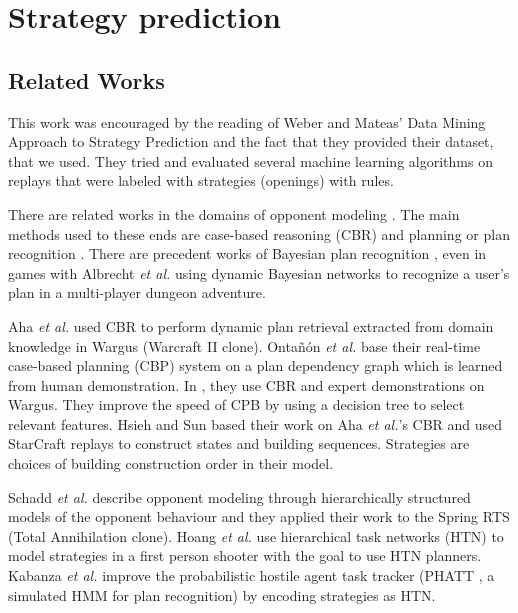 \section{Strategy prediction}

\subsection{Related Works}
This work was encouraged by the reading of Weber and Mateas' Data Mining Approach to Strategy Prediction \citep{weberStrat} and the fact that they provided their dataset, that we used. They tried and evaluated several machine learning algorithms on replays that were labeled with strategies (openings) with rules.


There are related works in the domains of opponent modeling \citep{HsiehS08,schadd2007opponent,OBRecog}. The main methods used to these ends are case-based reasoning (CBR) and planning or plan recognition \citep{LTW,CBR_Planning,OntanonCBR,HTNPlanning,Ramirez}. There are precedent works of Bayesian plan recognition \citep{BMPR}, even in games with Albrecht \textit{et al.} \citep{BayesianRecog} using dynamic Bayesian networks to recognize a user's plan in a multi-player dungeon adventure. 

Aha \textit{et al.} \citep{LTW} used CBR to perform dynamic plan retrieval extracted from domain knowledge in Wargus (Warcraft II clone). Onta\~{n}\'{o}n \textit{et al.} \citep{CBR_Planning} base their real-time case-based planning (CBP) system on a plan dependency graph which is learned from human demonstration. In \citep{OntanonCBR,PlanRetrieval}, they use CBR and expert demonstrations on Wargus. %
They improve the speed of CPB by using a decision tree to select relevant features. Hsieh and Sun \citep{HsiehS08} based their work on Aha \textit{et al.}'s CBR \citep{LTW} and used StarCraft replays to construct states and building sequences. Strategies are choices of building construction order in their model. 

Schadd \textit{et al.} \citep{schadd2007opponent} describe opponent modeling through hierarchically structured models of the opponent behaviour and they applied their work to the Spring RTS (Total Annihilation clone). Hoang \textit{et al.} \citep{HTNPlanning} use hierarchical task networks (HTN) to model strategies in a first person shooter with the goal to use HTN planners. Kabanza \textit{et al.} \citep{OBRecog} improve the probabilistic hostile agent task tracker (PHATT \citep{PHATT}, a simulated HMM for plan recognition) by encoding strategies as HTN.

